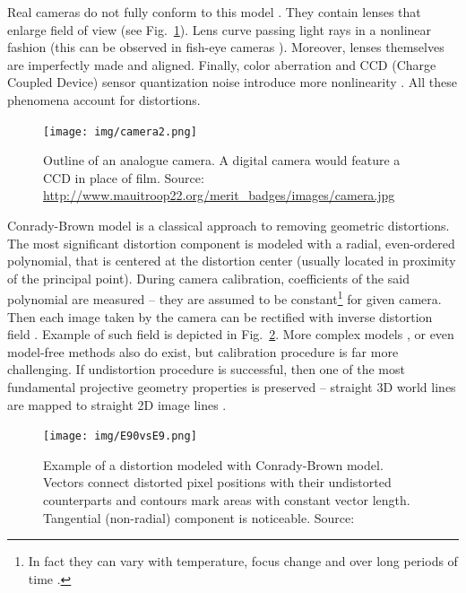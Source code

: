 Real cameras do not fully conform to this model \cite{szczesny}. They contain lenses that enlarge field of view (see Fig.~\ref{fig:analogue}). Lens curve passing light rays in a nonlinear fashion (this can be observed in fish-eye cameras \cite{fisheye_endoscopy}). Moreover, lenses themselves are imperfectly made and aligned. Finally, color aberration and CCD (Charge Coupled Device) sensor quantization noise introduce more nonlinearity \cite{heikkla14}. All these phenomena account for distortions.

\begin{figure}[ht]
	\centering\texttt{[image: img/camera2.png]}
	\caption{Outline of an analogue camera. A digital camera would feature a CCD in place of film. Source: \url{ http://www.mauitroop22.org/merit_badges/images/camera.jpg} }
	\label{fig:analogue}
\end{figure}

Conrady-Brown model \cite{brown8} \cite{Zhang_flexible} is a classical approach to removing geometric distortions. The most significant distortion component is modeled with a radial, even-ordered polynomial, that is centered at the distortion center (usually located in proximity of the principal point). During camera calibration, coefficients of the said polynomial are measured -- they are assumed to be constant\footnote{In fact they can vary with temperature, focus change and over long periods of time \cite{google_calibration}.} for given camera. Then each image taken by the camera can be rectified with inverse distortion field \cite{opencv}. Example of such field is depicted in Fig.~\ref{fig:brown}. More complex models \cite{simultaneous}, or even model-free methods \cite{towards} \cite{parameterfree} also do exist, but calibration procedure is far more challenging. If undistortion procedure is successful, then one of the most fundamental projective geometry properties is preserved -- straight 3D world lines are mapped to straight 2D image lines \cite{straight}.

\begin{figure}[ht]
	\centering\texttt{[image: img/E90vsE9.png]}
	\caption{Example of a distortion modeled with Conrady-Brown model. Vectors connect distorted pixel positions with their undistorted counterparts and contours mark areas with constant vector length. Tangential (non-radial) component is noticeable. Source: \cite{szczesny} }
	\label{fig:brown}
\end{figure}



